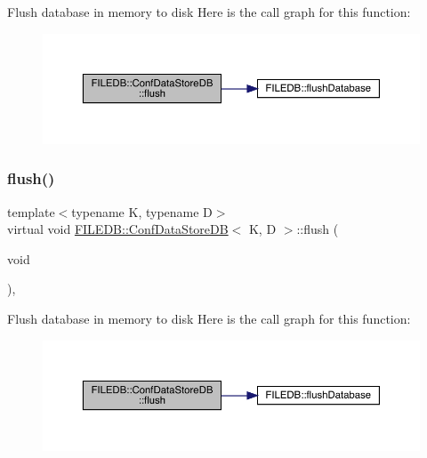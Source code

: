 Flush database in memory to disk Here is the call graph for this function\+:
\nopagebreak
\begin{figure}[H]
\begin{center}
\leavevmode
\includegraphics[width=350pt]{d8/d19/classFILEDB_1_1ConfDataStoreDB_a982ae3b2108acbf75ab15a939fc7871b_cgraph}
\end{center}
\end{figure}
\mbox{\label{classFILEDB_1_1ConfDataStoreDB_a982ae3b2108acbf75ab15a939fc7871b}} 
\subsubsection{\texorpdfstring{flush()}{flush()}\hspace{0.1cm}{\footnotesize\ttfamily [2/3]}}
{\footnotesize\ttfamily template$<$typename K, typename D$>$ \\
virtual void \mbox{\hyperlink{classFILEDB_1_1ConfDataStoreDB}{F\+I\+L\+E\+D\+B\+::\+Conf\+Data\+Store\+DB}}$<$ K, D $>$\+::flush (\begin{DoxyParamCaption}\item[{void}]{ }\end{DoxyParamCaption})\hspace{0.3cm}{\ttfamily [inline]}, {\ttfamily [virtual]}}

Flush database in memory to disk Here is the call graph for this function\+:
\nopagebreak
\begin{figure}[H]
\begin{center}
\leavevmode
\includegraphics[width=350pt]{d8/d19/classFILEDB_1_1ConfDataStoreDB_a982ae3b2108acbf75ab15a939fc7871b_cgraph}
\end{center}
\end{figure}
\mbox{\label{classFILEDB_1_1ConfDataStoreDB_a982ae3b2108acbf75ab15a939fc7871b}} 
